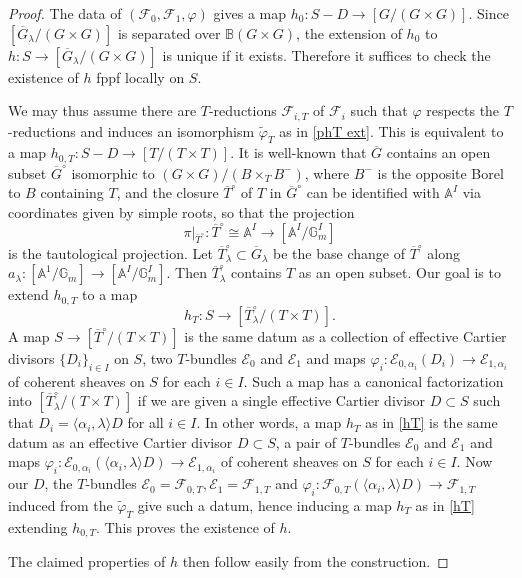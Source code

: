\documentclass[reqno]{amsart}
\numberwithin{equation}{subsection}
\theoremstyle{definition}
\def\AA{\mathbb{A}}
\def\BB{\mathbb{B}}
\def\GG{\mathbb{G}}
\newcommand\cE{\mathcal{E}}
\newcommand\cF{\mathcal{F}}
\newcommand{\Gm}{\GG_m}
\renewcommand{\j}[1]{\langle{#1}\rangle}
\newcommand{\wt}[1]{\widetilde{#1}}
\newcommand{\ov}{\overline}
\renewcommand\c\circ
\renewcommand\a\alpha
\newcommand{\ph}{\varphi}
\renewcommand{\l}{\lambda}
\begin{document}
\begin{proof} The data of $(\cF_{0}, \cF_{1}, \ph)$ gives a map $h_{0}: S-D\to [G/(G\times G)]$. Since $[\ov G_{\l}/(G\times G)]$ is  separated over $\BB(G\times G)$, the extension of $h_{0}$ to $h: S\to [\ov G_{\l}/(G\times G)]$ is unique if it exists. Therefore it suffices to check the existence of $h$ fppf locally on $S$. 

We may thus assume there are $T$-reductions $\cF_{i,T}$ of $\cF_{i}$ such that $\ph$ respects the $T$-reductions and induces an isomorphism $\wt\ph_{T}$ as in \eqref{phT ext}. This is equivalent to a map $h_{0,T}: S-D\to [T/(T\times T)]$. It is well-known that $\ov G$ contains an open subset $\ov G^{\c}$ isomorphic to $(G\times G)/(B\times_{T}B^{-})$, where $B^{-}$ is the opposite Borel to $B$ containing $T$, and the closure $\ov T^{\c}$ of $T$ in $\ov G^{\c}$ can be identified with $\AA^{I}$ via coordinates given by simple roots, so that the projection 
\[
\pi|_{\ov T^{\c}}: \ov T^{\c}\cong \AA^{I}\to [\AA^{I}/\Gm^{I}]
\]
is the tautological projection.  Let $\ov T^{\c}_{\l}\subset \ov G_{\l}$ be the base change of $\ov T^{\c}$ along $a_{\l}: [\AA^{1}/\Gm]\to [\AA^{I}/\Gm^{I}]$. Then $\ov T^{\c}_{\l}$ contains $T$ as an open subset. Our goal is to extend $h_{0,T}$ to a map
\begin{equation}\label{hT}
h_{T}: S\to [\ov T^{\c}_{\l}/(T\times T)]. 
\end{equation}
A map $S\to [\ov T^{\c}/(T\times T)]$ is the same datum as a collection of effective Cartier divisors $\{D_{i}\}_{i\in I}$ on $S$,  two $T$-bundles $\cE_{0}$ and $\cE_{1}$ and maps $\ph_{i}: \cE_{0, \alpha_i}(D_i) \rightarrow \cE_{1, \alpha_i}$ of coherent sheaves on $S$ for each $i\in I$. Such a map has a canonical factorization into $[\ov T^{\c}_{\l}/(T\times T)]$ if we are given a single effective Cartier divisor $D\subset S$ such that $D_{i}=\j{\a_{i},\l}D$ for all $i\in I$. In other words, a map $h_{T}$ as in \eqref{hT} is the same datum as an effective Cartier divisor $D\subset S$, a pair of  $T$-bundles $\cE_{0}$ and $\cE_{1}$ and maps $\ph_{i}: \cE_{0,\a_{i}}(\j{\a_{i}, \l}D)\to \cE_{1,\a_{i}}$ of coherent sheaves on $S$ for each $i\in I$.  Now our $D$, the $T$-bundles $\cE_{0}=\cF_{0,T}, \cE_{1}=\cF_{1,T}$ and $\ph_{i}: \cF_{0,T}(\j{\a_{i}, \l}D)\to \cF_{1,T}$ induced from the $\wt\ph_{T}$ give such a datum, hence inducing a map $h_{T}$ as in \eqref{hT} extending $h_{0,T}$. This proves the existence of $h$. 

The claimed properties of $h$ then follow easily from the construction. 
\end{proof} 
\end{document}

